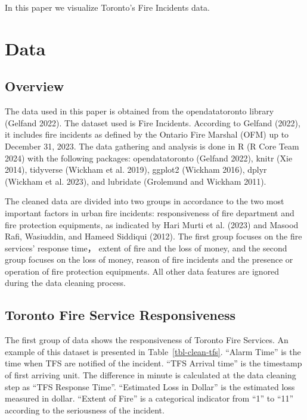 \documentclass[
  letterpaper,
  DIV=11,
  numbers=noendperiod]{scrartcl}
\begin{document}
In this paper we visualize Toronto's Fire Incidents data.

\section{Data}\label{data}

\subsection{Overview}\label{sec-data-overview}

The data used in this paper is obtained from the opendatatoronto library
(Gelfand 2022). The dataset used is Fire Incidents. According to Gelfand
(2022), it includes fire incidents as defined by the Ontario Fire
Marshal (OFM) up to December 31, 2023. The data gathering and analysis
is done in R (R Core Team 2024) with the following packages:
opendatatoronto (Gelfand 2022), knitr (Xie 2014), tidyverse (Wickham et
al. 2019), ggplot2 (Wickham 2016), dplyr (Wickham et al. 2023), and
lubridate (Grolemund and Wickham 2011).

The cleaned data are divided into two groups in accordance to the two
most important factors in urban fire incidents: responsiveness of fire
department and fire protection equipments, as indicated by Hari Murti et
al. (2023) and Masood Rafi, Wasiuddin, and Hameed Siddiqui (2012). The
first group focuses on the fire services' response time， extent of fire
and the loss of money, and the second group focuses on the loss of
money, reason of fire incidents and the presence or operation of fire
protection equipments. All other data features are ignored during the
data cleaning process.

\subsection{Toronto Fire Service
Responsiveness}\label{toronto-fire-service-responsiveness}

The first group of data shows the responsiveness of Toronto Fire
Services. An example of this dataset is presented in
Table~\ref{tbl-clean-tfs}. ``Alarm Time'' is the time when TFS are
notified of the incident. ``TFS Arrival time'' is the timestamp of first
arriving unit. The difference in minute is calculated at the data
cleaning step as ``TFS Response Time''. ``Estimated Loss in Dollar'' is
the estimated loss measured in dollar. ``Extent of Fire'' is a
categorical indicator from ``1'' to ``11'' according to the seriousness
of the incident.
\end{document}
